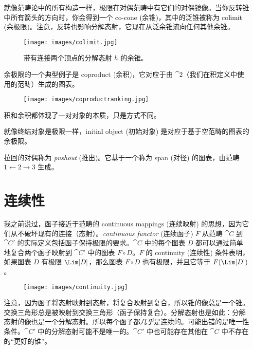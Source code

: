 就像范畴论中的所有构造一样，极限在对偶范畴中有它们的对偶镜像。当你反转锥中所有箭头的方向时，你会得到一个 co-cone (余锥)，其中的泛锥被称为 colimit (余极限)。注意，反转也影响分解态射，它现在从泛余锥流向任何其他余锥。

\begin{figure}[H]
  \centering
  \texttt{[image: images/colimit.jpg]}
  \caption{带有连接两个顶点的分解态射 $h$ 的余锥。}
\end{figure}

\noindent
余极限的一个典型例子是 coproduct (余积)，它对应于由 $\cat{2}$（我们在积定义中使用的范畴）生成的图表。

\begin{figure}[H]
  \centering
  \texttt{[image: images/coproductranking.jpg]}
\end{figure}

\noindent
积和余积都体现了一对对象的本质，只是方式不同。

就像终结对象是极限一样，initial object (初始对象) 是对应于基于空范畴的图表的余极限。

拉回的对偶称为 \emph{pushout} (推出)。它基于一个称为 span (对径) 的图表，由范畴 $1\leftarrow2\rightarrow3$ 生成。

\section{连续性}

我之前说过，函子接近于范畴的 continuous mappings (连续映射) 的思想，因为它们从不破坏现有的连接（态射）。\emph{continuous functor} (连续函子) $F$ 从范畴 $\cat{C}$ 到 $\cat{C'}$ 的实际定义包括函子保持极限的要求。$\cat{C}$ 中的每个图表 $D$ 都可以通过简单地复合两个函子映射到 $\cat{C'}$ 中的图表 $F \circ D$。$F$ 的 continuity (连续性) 条件表明，如果图表 $D$ 有极限 $\Lim[D]$，那么图表 $F \circ D$ 也有极限，并且它等于 $F (\Lim[D])$。

\begin{figure}[H]
  \centering
  \texttt{[image: images/continuity.jpg]}
\end{figure}

\noindent
注意，因为函子将态射映射到态射，将复合映射到复合，所以锥的像总是一个锥。交换三角形总是被映射到交换三角形（函子保持复合）。分解态射也是如此：分解态射的像也是一个分解态射。所以每个函子都\emph{几乎}是连续的。可能出错的是唯一性条件。$\cat{C'}$ 中的分解态射可能不是唯一的。$\cat{C'}$ 中也可能存在其他在 $\cat{C}$ 中不存在的“更好的锥”。

